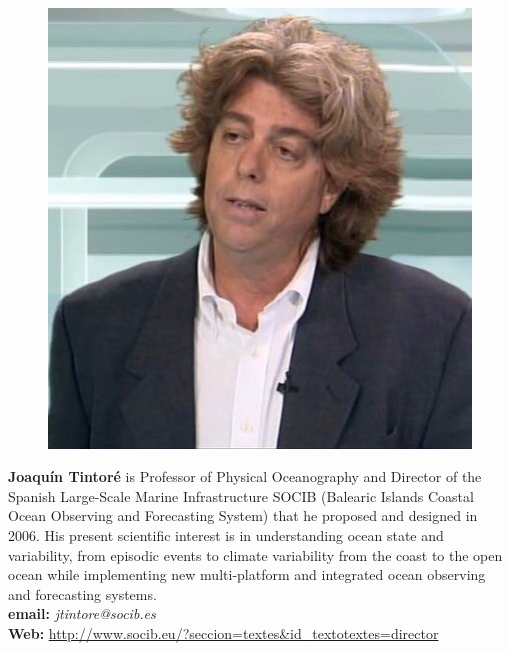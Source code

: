 \documentclass[12pt]{article}
\begin{document}
\vspace*{0.5cm}
\parbox{6.5in}{
\begin{figure}
 \centering
  \includegraphics[width=.75\linewidth]{fig/JTintore.jpeg}
\end{figure}

\textbf{Joaqu\'{i}n Tintor\'{e}} is Professor of Physical Oceanography
and Director of the Spanish Large-Scale Marine Infrastructure SOCIB
(Balearic Islands Coastal Ocean Observing and Forecasting System) that
he proposed and designed in 2006. His present scientific interest is
in understanding ocean state and variability, from episodic events to
climate variability from the coast to the open ocean while
implementing new multi-platform and integrated ocean observing and
forecasting systems.
\\
\textbf{email: }\emph{jtintore@socib.es} \\
\textbf{Web:
}\url{http://www.socib.eu/?seccion=textes&id_textotextes=director} }
\end{document}
